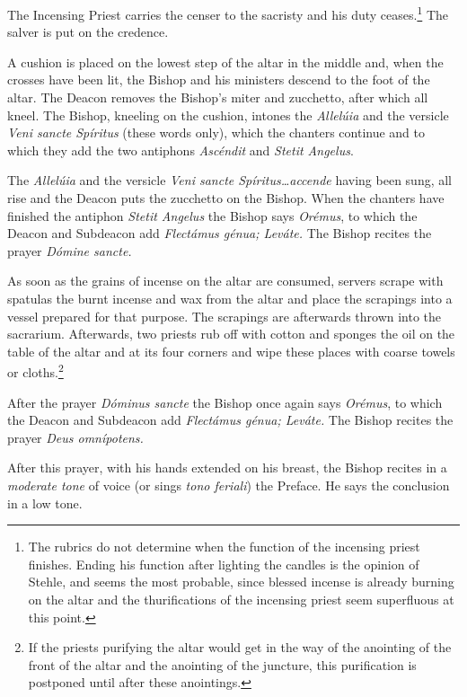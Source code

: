 \documentclass[letterpaper]{report}
\begin{document}
{    The Incensing Priest carries the censer to the sacristy and his duty
    ceases.\footnote{The rubrics do not determine when the function of the
    incensing priest finishes. Ending his function after lighting the candles
    is the opinion of Stehle, and seems the most probable, since blessed
    incense is already burning on the altar and the thurifications of the
    incensing priest seem superfluous at this point.} The salver is put
    on the credence.

    \rubric A cushion is placed on the lowest step of the altar in the middle
    and, when the crosses have been lit, the Bishop and his ministers descend
    to the foot of the altar. The Deacon removes the Bishop's miter and
    zucchetto, after which all kneel. The Bishop, kneeling on the cushion,
    intones the \textit{Allel\'uia} and the versicle \textit{Veni sancte
    Spíritus} (these words only), which the chanters continue and to which they
    add the two antiphons \textit{Ascéndit} and \textit{Stetit Angelus}.

    \rubric The \textit{Allel\'uia} and the versicle \textit{Veni sancte
    Spíritus\dots accende} having been sung, all rise and the Deacon puts the
    zucchetto on the Bishop. When the chanters have finished the antiphon
    \textit{Stetit Angelus} the Bishop says \textit{Orémus}, to which the Deacon
    and Subdeacon add \textit{Flectámus génua; Leváte.} The Bishop recites the
    prayer \textit{Dómine sancte.}

    \rubric As soon as the grains of incense on the altar are consumed, servers
    scrape with spatulas the burnt incense and wax from the altar and place the
    scrapings into a vessel prepared for that purpose. The scrapings are
    afterwards thrown into the sacrarium. Afterwards, two priests rub off with
    cotton and sponges the oil on the table of the altar and at its four
    corners and wipe these places with coarse towels or cloths.\footnote{If the
    priests purifying the altar would get in the way of the anointing of the
    front of the altar and the anointing of the juncture, this purification is
    postponed until after these anointings.}

    \rubric After the prayer \textit{Dóminus sancte} the Bishop once again says
    \textit{Orémus}, to which the Deacon and Subdeacon add \textit{Flectámus
    génua; Leváte.} The Bishop recites the prayer \textit{Deus omnípotens.}

    \rubric After this prayer, with his hands extended on his breast, the Bishop
    recites in a \textit{moderate tone} of voice (or sings \textit{tono feriali})
    the Preface. He says the conclusion in a low tone.

}
\end{document}
